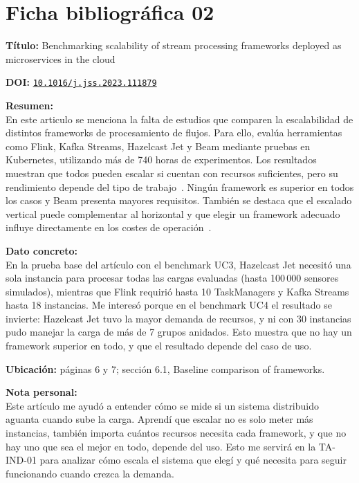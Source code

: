 \documentclass[12pt,a4paper]{article}
\newcommand{\ficha}[6]{%
  \section*{Ficha bibliográfica #1}
  \textbf{Título:} #2

  \textbf{DOI:} \href{https://doi.org/#3}{\nolinkurl{#3}}

  \textbf{Resumen:}\\
  #4

  \textbf{Dato concreto:}\\
  #5

  \textbf{Nota personal:}\\
  #6

  \vspace{0.6cm}
}
\begin{document}
\ficha{02}
{Benchmarking scalability of stream processing frameworks deployed as microservices in the cloud}
{10.1016/j.jss.2023.111879}
{En este articulo se menciona la falta de estudios que comparen la escalabilidad de distintos frameworks de procesamiento de flujos. Para ello, evalúa herramientas como Flink, Kafka Streams, Hazelcast Jet y Beam mediante pruebas en Kubernetes, utilizando más de 740 horas de experimentos. Los resultados muestran que todos pueden escalar si cuentan con recursos suficientes, pero su rendimiento depende del tipo de trabajo~\cite{henning2024benchmarking}. Ningún framework es superior en todos los casos y Beam presenta mayores requisitos. También se destaca que el escalado vertical puede complementar al horizontal y que elegir un framework adecuado influye directamente en los costes de operación~\cite{henning2024benchmarking}.}
{En la prueba base del artículo con el benchmark UC3, Hazelcast Jet necesitó una sola instancia para procesar todas las cargas evaluadas (hasta 100\,000 sensores simulados), mientras que Flink requirió hasta 10 TaskManagers y Kafka Streams hasta 18 instancias. Me interesó porque en el benchmark UC4 el resultado se invierte: Hazelcast Jet tuvo la mayor demanda de recursos, y ni con 30 instancias pudo manejar la carga de más de 7 grupos anidados. Esto muestra que no hay un framework superior en todo, y que el resultado depende del caso de uso.
\par\medskip\textbf{Ubicación:} páginas 6 y 7; sección 6.1, Baseline comparison of frameworks.}
{Este artículo me ayudó a entender cómo se mide si un sistema distribuido aguanta cuando sube la carga. Aprendí que escalar no es solo meter más instancias, también importa cuántos recursos necesita cada framework, y que no hay uno que sea el mejor en todo, depende del uso. Esto me servirá en la TA-IND-01 para analizar cómo escala el sistema que elegí y qué necesita para seguir funcionando cuando crezca la demanda.}
\end{document}
